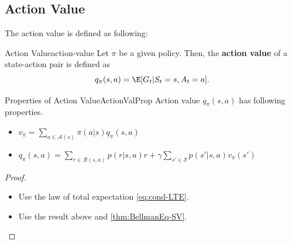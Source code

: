     \subsection{Action Value}
        The action value is defined as following:
        \begin{defn}{Action Value}{action-value}
            Let $\pi$ be a given policy. Then, the \textbf{action value} of a state-action pair is defined as
            \begin{equation}
                q_\pi(s,a) = \E[G_t|S_t=s,A_t=a].
            \end{equation}
        \end{defn}
        \begin{rem}{Properties of Action Value}{ActionValProp}
            Action value $q_\pi(s,a)$ has following properties.
            \begin{itemize}
                \item $v_\pi=\sum_{a \in \mathcal{A}(s)} \pi(a|s)q_\pi(s,a)$
                \item $q_\pi(s,a) = \sum_{r \in \mathcal{R}(s,a)}p(r|s,a)r + \gamma \sum_{s' \in \mathcal{S}}p(s'|s,a)v_\pi(s')$
            \end{itemize}
        \end{rem}
        \begin{proof}
            \begin{itemize}
                \item Use the law of total expectation \ref{eq:cond-LTE}.
                \item Use the result above and \ref{thm:BellmanEq-SV}.
            \end{itemize}
        \end{proof}
